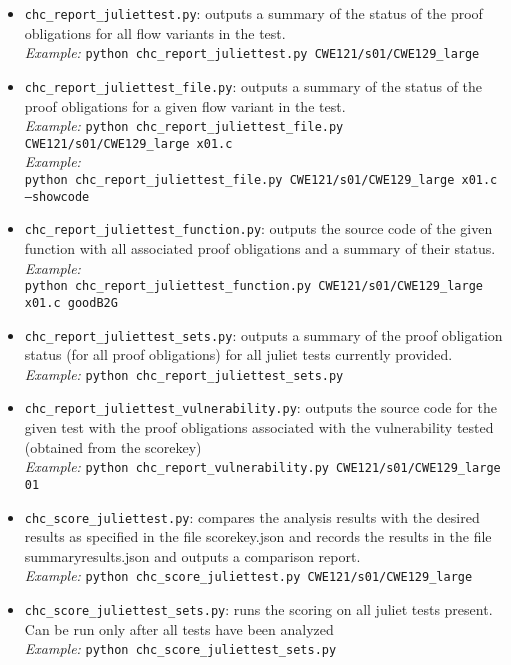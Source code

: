 \documentclass[11pt]{article}
\begin{document}
\begin{itemize}[leftmargin=*]
\item {\tt chc\_report\_juliettest.py}: outputs a summary of the status of the proof
   obligations for all flow variants in the test.\\
\emph{Example:} {\tt python chc\_report\_juliettest.py CWE121/s01/CWE129\_large}
\item {\tt chc\_report\_juliettest\_file.py}: outputs a summary of the status of the
   proof obligations for a given flow variant in the test. \\
\emph{Example:} {\tt python chc\_report\_juliettest\_file.py CWE121/s01/CWE129\_large x01.c}\\
\emph{Example:} \\
{\tt python chc\_report\_juliettest\_file.py CWE121/s01/CWE129\_large x01.c 
 --showcode}
\item {\tt chc\_report\_juliettest\_function.py}: outputs the source code of the given
   function with all associated proof obligations and a summary of their status.\\
\emph{Example:}\\
 {\tt python chc\_report\_juliettest\_function.py CWE121/s01/CWE129\_large x01.c goodB2G}
\item {\tt chc\_report\_juliettest\_sets.py}: outputs a summary of the proof obligation
  status (for all proof obligations) for all juliet tests currently provided.\\
\emph{Example:} {\tt python chc\_report\_juliettest\_sets.py}
\item {\tt chc\_report\_juliettest\_vulnerability.py}: outputs the source code for the
  given test with the proof obligations associated with the vulnerability tested
  (obtained from the scorekey) \\
\emph{Example:} {\tt python chc\_report\_vulnerability.py CWE121/s01/CWE129\_large 01}
\item {\tt chc\_score\_juliettest.py}: compares the analysis results with the desired results
   as specified in the file scorekey.json and records the results in the file summaryresults.json 
   and outputs a comparison report. \\
\emph{Example:} {\tt python chc\_score\_juliettest.py CWE121/s01/CWE129\_large}
\item {\tt chc\_score\_juliettest\_sets.py}: runs the scoring on all juliet tests present.
Can be run only after all tests have been analyzed \\
\emph{Example:} {\tt python chc\_score\_juliettest\_sets.py}
\end{itemize}
\end{document}
